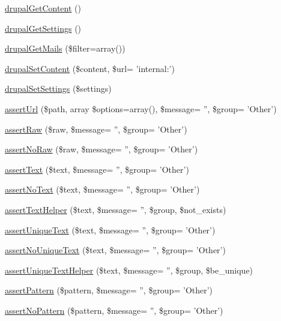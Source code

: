 \begin{DoxyCompactItemize}
\hyperlink{classDrupalWebTestCase_a65cc4334da96452d127a9fb50636e7bb}{drupalGetContent} ()
\item 
\hyperlink{classDrupalWebTestCase_a26f4d98c9c74d18e7a97a307bc9507f7}{drupalGetSettings} ()
\item 
\hyperlink{classDrupalWebTestCase_af2c147ab7789a251a27aa88a70282432}{drupalGetMails} (\$filter=array())
\item 
\hyperlink{classDrupalWebTestCase_a75c4e29bdb78951d61993b13985bad1c}{drupalSetContent} (\$content, \$url= 'internal:')
\item 
\hyperlink{classDrupalWebTestCase_aa6e1bac7cd3cdf0eb21c1656733534d2}{drupalSetSettings} (\$settings)
\item 
\hyperlink{classDrupalWebTestCase_af3092e3c713ffab340de6d9e4e8cdcba}{assertUrl} (\$path, array \$options=array(), \$message= '', \$group= 'Other')
\item 
\hyperlink{classDrupalWebTestCase_ae15c8d3302ff90dc47d2fd7686ee4005}{assertRaw} (\$raw, \$message= '', \$group= 'Other')
\item 
\hyperlink{classDrupalWebTestCase_ae683aebc33c05b0ba2e7e3f06f4485a9}{assertNoRaw} (\$raw, \$message= '', \$group= 'Other')
\item 
\hyperlink{classDrupalWebTestCase_ad721f3f08df154f1ccaf7b8ab0d2d9d0}{assertText} (\$text, \$message= '', \$group= 'Other')
\item 
\hyperlink{classDrupalWebTestCase_aa2d5a43e1615b89589b7c8b2a2e4f487}{assertNoText} (\$text, \$message= '', \$group= 'Other')
\item 
\hyperlink{classDrupalWebTestCase_af32f99ced29cbfd6ad8b94f2ac64869a}{assertTextHelper} (\$text, \$message= '', \$group, \$not\_\-exists)
\item 
\hyperlink{classDrupalWebTestCase_aa8d65b2749e7d0430b07bd77f7f4877b}{assertUniqueText} (\$text, \$message= '', \$group= 'Other')
\item 
\hyperlink{classDrupalWebTestCase_a058c82a867e22a61b68891a009294e7b}{assertNoUniqueText} (\$text, \$message= '', \$group= 'Other')
\item 
\hyperlink{classDrupalWebTestCase_a26023bcb28eac7d4674eb430e7af6b2d}{assertUniqueTextHelper} (\$text, \$message= '', \$group, \$be\_\-unique)
\item 
\hyperlink{classDrupalWebTestCase_a5838fb78298156ab4de6a2ff5cdc4f8b}{assertPattern} (\$pattern, \$message= '', \$group= 'Other')
\item 
\hyperlink{classDrupalWebTestCase_a03d422398b9fc1f8844b7ff7fe468ed5}{assertNoPattern} (\$pattern, \$message= '', \$group= 'Other')

\end{DoxyCompactItemize}
